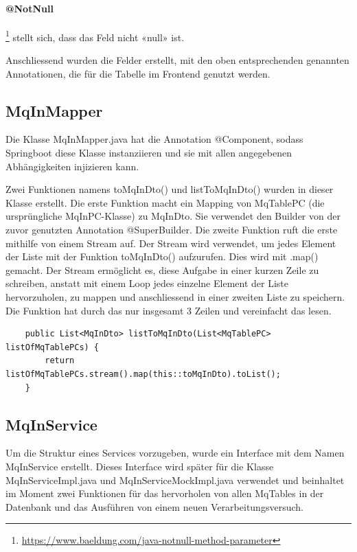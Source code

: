 \paragraph{@NotNull} \footnote{\url{https://www.baeldung.com/java-notnull-method-parameter}} stellt sich, dass das Feld nicht «null» ist.\newline

\noindent Anschliessend wurden die Felder erstellt, mit den oben entsprechenden genannten Annotationen, die für die Tabelle im Frontend genutzt werden.

\subsection{MqInMapper}
Die Klasse MqInMapper.java hat die Annotation @Component, sodass Springboot diese Klasse instanziieren und sie mit allen angegebenen Abhängigkeiten injizieren kann.

Zwei Funktionen namens toMqInDto() und listToMqInDto() wurden in dieser Klasse erstellt. Die erste Funktion macht ein Mapping von MqTablePC (die ursprüngliche MqInPC-Klasse) zu MqInDto. Sie verwendet den Builder von der zuvor genutzten Annotation @SuperBuilder. Die zweite Funktion ruft die erste mithilfe von einem Stream auf. Der Stream wird verwendet, um jedes Element der Liste mit der Funktion toMqInDto() aufzurufen. Dies wird mit .map() gemacht. Der Stream ermöglicht es, diese Aufgabe in einer kurzen Zeile zu schreiben, anstatt mit einem Loop jedes einzelne Element der Liste hervorzuholen, zu mappen und anschliessend in einer zweiten Liste zu speichern. Die Funktion hat durch das nur insgesamt 3 Zeilen und vereinfacht das lesen.

\begin{verbatim}
	public List<MqInDto> listToMqInDto(List<MqTablePC> listOfMqTablePCs) {
		return listOfMqTablePCs.stream().map(this::toMqInDto).toList();
	}
\end{verbatim}

\subsection{MqInService}
Um die Struktur eines Services vorzugeben, wurde ein Interface mit dem Namen MqInService erstellt. Dieses Interface wird später für die Klasse MqInServiceImpl.java und MqInServiceMockImpl.java verwendet und beinhaltet im Moment zwei Funktionen für das hervorholen von allen MqTables in der Datenbank und das Ausführen von einem neuen Verarbeitungsversuch.

